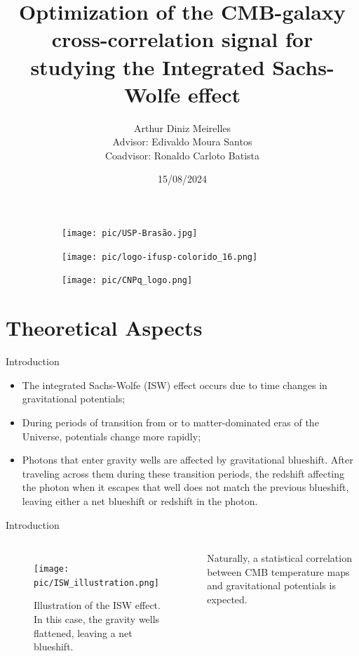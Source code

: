 \documentclass[serif, aspectratio=169]{beamer}
\author{Arthur Diniz Meirelles \\
	\vspace{0.2cm}
	\small Advisor: Edivaldo Moura Santos \\
	\small Coadvisor: Ronaldo Carloto Batista}
\title{Optimization of the CMB-galaxy cross-correlation signal for studying the Integrated Sachs-Wolfe effect}
\institute{
    Institute of Physics \\
    Universidade de São Paulo
}
\date{\small 15/08/2024}
\begin{document}
\begin{frame}
	\titlepage
    \vspace*{-1.5cm}
    \begin{figure}[htpb]
    \centering
    \begin{subfigure}[t]{0.17\textwidth}
        \centering
        \texttt{[image: pic/USP-Brasão.jpg]}
    \end{subfigure}
    \begin{subfigure}[t]{0.25\textwidth}
        \centering
        \texttt{[image: pic/logo-ifusp-colorido\_16.png]}
    \end{subfigure}
    \hfill
    \begin{subfigure}[t]{0.25\textwidth}
        \centering
        \texttt{[image: pic/CNPq\_logo.png]}
    \end{subfigure}
    \end{figure}
\end{frame}

\begin{frame}    
\tableofcontents[sectionstyle=show,
subsectionstyle=show/shaded/hide,
subsubsectionstyle=show/shaded/hide]
\end{frame}


\section{Theoretical Aspects}

\begin{frame}{Introduction}
    \begin{itemize}
        \item The integrated Sachs-Wolfe (ISW) effect occurs due to time changes in gravitational potentials;
        \item During periods of transition from or to matter-dominated eras of the Universe, potentials change more rapidly;
        \item Photons that enter gravity wells are affected by gravitational blueshift. After traveling across them during these transition periods, the redshift affecting the photon when it escapes that well does not match the previous blueshift, leaving either a net blueshift or redshift in the photon.
    \end{itemize}
\end{frame}

\begin{frame}{Introduction}
    \begin{columns}
        \begin{figure}
            \centering
            \texttt{[image: pic/ISW\_illustration.png]}
            \caption{Illustration of the ISW effect. In this case, the gravity wells flattened, leaving a net blueshift.}
            \label{fig:ISW_illustration}
        \end{figure}
        Naturally, a statistical correlation between CMB temperature maps and gravitational potentials is expected.
    \end{columns}
\end{frame}
\end{document}
